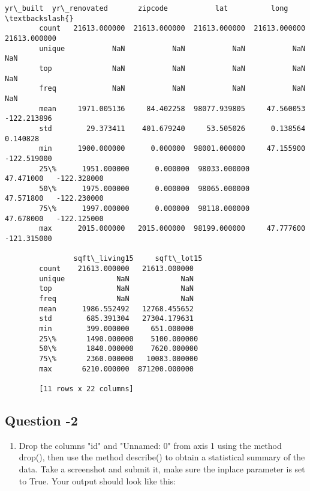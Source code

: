 \documentclass[11pt]{article}
\providecommand{\tightlist}{%
      \setlength{\itemsep}{0pt}\setlength{\parskip}{0pt}}
\begin{document}
\begin{Verbatim}[commandchars=\\\{\}]
                    yr\_built  yr\_renovated       zipcode           lat          long  \textbackslash{}
        count   21613.000000  21613.000000  21613.000000  21613.000000  21613.000000   
        unique           NaN           NaN           NaN           NaN           NaN   
        top              NaN           NaN           NaN           NaN           NaN   
        freq             NaN           NaN           NaN           NaN           NaN   
        mean     1971.005136     84.402258  98077.939805     47.560053   -122.213896   
        std        29.373411    401.679240     53.505026      0.138564      0.140828   
        min      1900.000000      0.000000  98001.000000     47.155900   -122.519000   
        25\%      1951.000000      0.000000  98033.000000     47.471000   -122.328000   
        50\%      1975.000000      0.000000  98065.000000     47.571800   -122.230000   
        75\%      1997.000000      0.000000  98118.000000     47.678000   -122.125000   
        max      2015.000000   2015.000000  98199.000000     47.777600   -121.315000   
        
                sqft\_living15     sqft\_lot15  
        count    21613.000000   21613.000000  
        unique            NaN            NaN  
        top               NaN            NaN  
        freq              NaN            NaN  
        mean      1986.552492   12768.455652  
        std        685.391304   27304.179631  
        min        399.000000     651.000000  
        25\%       1490.000000    5100.000000  
        50\%       1840.000000    7620.000000  
        75\%       2360.000000   10083.000000  
        max       6210.000000  871200.000000  
        
        [11 rows x 22 columns]
\end{Verbatim}
            
    \subsection{Question -2}\label{question--2}

    \begin{enumerate}
\def\labelenumi{\arabic{enumi})}
\setcounter{enumi}{1}
\tightlist
\item
  Drop the columns "id" and "Unnamed: 0" from axis 1 using the method
  drop(), then use the method describe() to obtain a statistical summary
  of the data. Take a screenshot and submit it, make sure the inplace
  parameter is set to True. Your output should look like this:
\end{enumerate}
\end{document}
